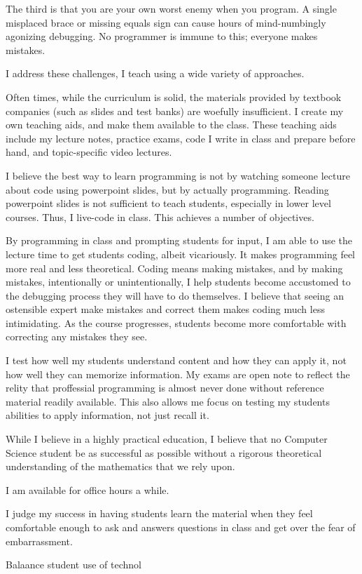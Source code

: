 \documentclass[10pt, a4paper]{article}
\begin{document}
The third is that you are your own worst enemy when you program.
A single misplaced brace or missing equals sign can cause hours of mind-numbingly agonizing debugging.
No programmer is immune to this; everyone makes mistakes.

I address these challenges, I teach using a wide variety of approaches.


Often times, while the curriculum is solid, the materials provided by textbook companies (such as slides and test banks) are woefully insufficient.
I create my own teaching aids, and make them available to the class.
These teaching aids include my lecture notes, practice exams, code I write in class and prepare before hand, and topic-specific video lectures.



I believe the best way to learn programming is not by watching someone lecture about code using powerpoint slides, but by actually programming.
Reading powerpoint slides is not sufficient to teach students, especially in lower level courses.
Thus, I live-code in class.
This achieves a number of objectives.

By programming in class and prompting students for input, I am able to use the lecture time to get students coding, albeit vicariously.
It makes programming feel more real and less theoretical.
Coding means making mistakes, and by making mistakes, intentionally or unintentionally, I help students become accustomed to the debugging process they will have to do themselves.
I believe that seeing an ostensible expert make mistakes and correct them makes coding much less intimidating.
As the course progresses, students become more comfortable with correcting any mistakes they see.




I test how well my students understand content and how they can apply it, not how well they can memorize information.
My exams are open note to reflect the relity that proffessial programming is almost never done without reference material readily available.
This also allows me focus on testing my students abilities to apply information, not just recall it.




While I believe in a highly practical education, I believe that no Computer Science student be as successful as possible without a rigorous theoretical understanding of the mathematics that we rely upon.

























I am available for office hours a while.


I judge my success in having students learn the material when they feel comfortable enough to ask and  answers questions in class and get over the fear of embarrassment.


Balaance student use of technol
\end{document}

